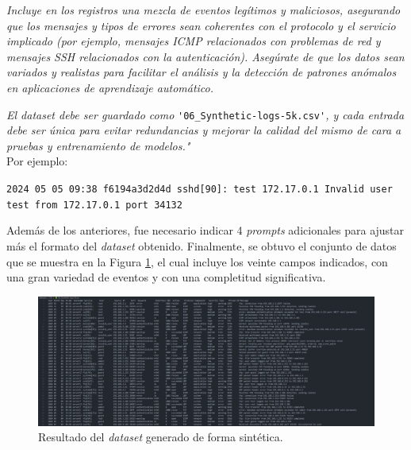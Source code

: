\begin{tcolorbox}[colframe=blue!25!white, colback=blue!10!white, title={\color{blue}\footnotesize \texttt{Prompt GPT4o - Generación Dataset Sintético II}}]
\footnotesize
\textit{Incluye en los registros una mezcla de eventos legítimos y maliciosos, asegurando que los mensajes y tipos de errores sean coherentes con el protocolo y el servicio implicado (por ejemplo, mensajes ICMP relacionados con problemas de red y mensajes SSH relacionados con la autenticación). Asegúrate de que los datos sean variados y realistas para facilitar el análisis y la detección de patrones anómalos en aplicaciones de aprendizaje automático.} \\
\end{tcolorbox}

\begin{tcolorbox}[colframe=blue!25!white, colback=blue!10!white, title={\color{blue}\footnotesize \texttt{Prompt GPT4o - Generación Dataset Sintético III}}]
\footnotesize
\textit{El dataset debe ser guardado como} \verb|'06_Synthetic-logs-5k.csv'|\textit{, y cada entrada debe ser única para evitar redundancias y mejorar la calidad del mismo de cara a pruebas y entrenamiento de modelos."} \\

Por ejemplo:

\begin{tcolorbox}[colframe=white, colback=white, top=1mm, bottom=1mm, boxrule=0pt]
    \texttt{2024	05	05	09:38	f6194a3d2d4d	sshd[90]: test  172.17.0.1 	Invalid user test from 172.17.0.1 port 34132}
\end{tcolorbox}
\end{tcolorbox}

\vspace{2mm}

Además de los anteriores, fue necesario indicar 4 \textit{prompts} adicionales para ajustar más el formato del \textit{dataset} obtenido. Finalmente, se obtuvo el conjunto de datos que se muestra en la Figura \ref{fig:synthetic-dataset}, el cual incluye los veinte campos indicados, con una gran variedad de eventos y con una completitud significativa. 

\begin{figure}[H]
    \centering
    \includegraphics[width=1\linewidth]{imagenes/synthetic-dataset.png}
    \caption{Resultado del \textit{dataset} generado de forma sintética.}
    \label{fig:synthetic-dataset}
\end{figure}

